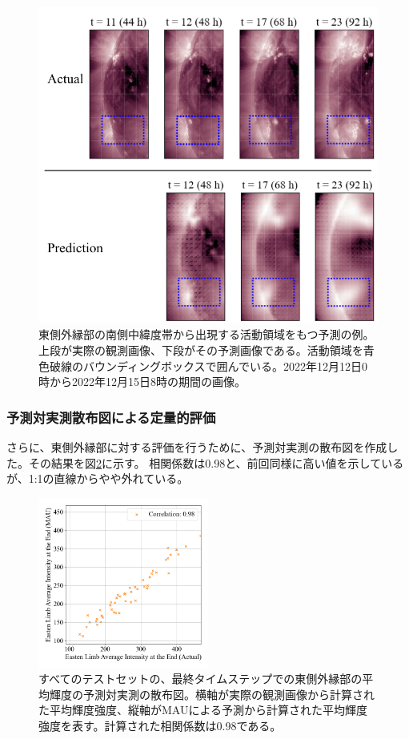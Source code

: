         \begin{figure}[htbp]
          \centering
          \includegraphics[width=\textwidth]{figures/exp2/limb_sample_12_caption.jpg}
          \caption{東側外縁部の南側中緯度帯から出現する活動領域をもつ予測の例。上段が実際の観測画像、下段がその予測画像である。活動領域を青色破線のバウンディングボックスで囲んでいる。2022年12月12日0時から2022年12月15日8時の期間の画像。}
          \label{fig:exp2_limb_example_2}
        \end{figure}

      \subsubsection{予測対実測散布図による定量的評価}
        さらに、東側外縁部に対する評価を行うために、予測対実測の散布図を作成した。その結果を図\ref{fig:exp2_limb_scatter}に示す。
        相関係数は0.98と、前回同様に高い値を示しているが、1:1の直線からやや外れている。
        \begin{figure}[htbp]
          \centering
          \includegraphics[width=0.5\textwidth]{figures/exp2/limb_scatter_gt_pd.png}
          \caption{すべてのテストセットの、最終タイムステップでの東側外縁部の平均輝度の予測対実測の散布図。横軸が実際の観測画像から計算された平均輝度強度、縦軸がMAUによる予測から計算された平均輝度強度を表す。計算された相関係数は0.98である。}
          \label{fig:exp2_limb_scatter}
        \end{figure}

